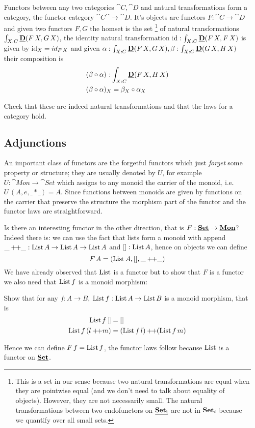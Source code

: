 Functors between any two categories $\cat{C},\cat{D}$ and natural transformations form a category, the functor category $\cat{C}\cat{\to}\cat{D}$. It's objects are functors $F : \cat{C} \to \cat{D}$ and given two functors $F,G$ the homset is the set
\footnote{This is a set in our sense because two natural transformations are equal when they are pointwise equal (and we don't need to talk about equality of objects). However, they are not necessarily small. The natural transformations between two endofunctors on $\underline{\mathbf{\mathbf{Set}_i}}$ are not in $\mathbf{Set}_i$ because we quantify over all small sets.}
of natural transformations $\int_{X:C} \underline{\mathbf{D}}(F\,X,G\,X)$, the identity natural transformation $\mathrm{id} : \int_{X:C}\underline{\mathbf{D}}(F\,X,F\,X)$ is given by $\mathrm{id}_X = id_{F\,X}$ and given $\alpha : \int_{X:C} \underline{\mathbf{D}}(F\,X,G\,X), \beta : \int_{X:C}\underline{\mathbf{D}}(G\,X,H\,X)$ their composition is 
\begin{align*}
& (\beta \circ \alpha) : \int_{X:C} \underline{\mathbf{D}}(F\,X,H\,X)\\
& (\beta \circ \alpha)_X = \beta_X \circ \alpha_X
\end{align*}
\begin{Exercise}
  Check that these are indeed natural transformations and that the laws for a category hold.
\end{Exercise}

\subsection{Adjunctions}
\label{sec:adjunctions}

An important class of functors are the forgetful functors which just \emph{forget} some property or structure; they are usually denoted by $U$, for example $U : \cat{Mon} \to \cat{Set}$ which assigns to any monoid the carrier of the monoid, i.e. $U\,(A,e,\_*\_) = A$. Since functions between monoids are given by functions on the carrier that preserve the structure the morphism part of the functor and the functor laws are straightforward. 

Is there an interesting functor in the other direction, that is $F : \underline{\mathbf{\mathbf{Set}}} \to \underline{\mathbf{Mon}}$? Indeed there is: we can use the fact that lists form a monoid with append $\_+\!\!+\_ : \mathrm{List}\,A \to \mathrm{List}\,A \to \mathrm{List}\,A$ and $[] : \mathrm{List}\,A$, hence on objects we can define
\[ F\,A = (\mathrm{List}\,A, [], \_+\!\!+\_) \]
We have already observed that $\mathrm{List}$ is a functor but to show that $F$ is a functor we also need that $\mathrm{List}\,f$ is a monoid morphism:
\begin{Exercise}
  Show that for any $f:A \to B$, $\mathrm{List}\,f : \mathrm{List}\,A \to \mathrm{List}\,B$ is a monoid morphism, that is
  \begin{align*}
    \mathrm{List}\,f\,[] & = [] \\
    \mathrm{List}\,f\,(l +\!\!+ m) & = (\mathrm{List}\,f\,l) +\!\!+ (\mathrm{List}\,f\,m)
  \end{align*}
\end{Exercise}
Hence we can define $F\,f = \mathrm{List}\,f$, the functor laws follow because $\mathrm{List}$ is a functor on $\underline{\mathbf{\mathbf{Set}}}$.

